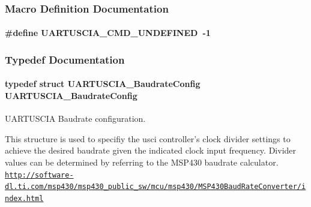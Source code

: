\subsubsection{Macro Definition Documentation}
\paragraph[{U\-A\-R\-T\-U\-S\-C\-I\-A\-\_\-\-C\-M\-D\-\_\-\-U\-N\-D\-E\-F\-I\-N\-E\-D}]{\setlength{\rightskip}{0pt plus 5cm}\#define U\-A\-R\-T\-U\-S\-C\-I\-A\-\_\-\-C\-M\-D\-\_\-\-U\-N\-D\-E\-F\-I\-N\-E\-D~-\/1}\label{_u_a_r_t_u_s_c_i_a_8h_ab16a1bf966f22b5eabf64c79fc49c33e}


\subsubsection{Typedef Documentation}
\paragraph[{U\-A\-R\-T\-U\-S\-C\-I\-A\-\_\-\-Baudrate\-Config}]{\setlength{\rightskip}{0pt plus 5cm}typedef struct {\bf U\-A\-R\-T\-U\-S\-C\-I\-A\-\_\-\-Baudrate\-Config}  {\bf U\-A\-R\-T\-U\-S\-C\-I\-A\-\_\-\-Baudrate\-Config}}\label{_u_a_r_t_u_s_c_i_a_8h_a9dd05c71b8c01f08e0e7a3d244b979a5}


U\-A\-R\-T\-U\-S\-C\-I\-A Baudrate configuration. 

This structure is used to specifiy the usci controller's clock divider settings to achieve the desired baudrate given the indicated clock input frequency. Divider values can be determined by referring to the M\-S\-P430 baudrate calculator. \href{http://software-dl.ti.com/msp430/msp430_public_sw/mcu/msp430/MSP430BaudRateConverter/index.html}{\tt http\-://software-\/dl.\-ti.\-com/msp430/msp430\-\_\-public\-\_\-sw/mcu/msp430/\-M\-S\-P430\-Baud\-Rate\-Converter/index.\-html}

